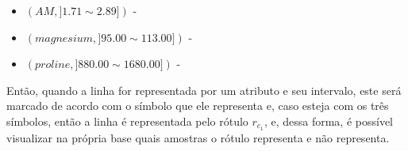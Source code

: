 \begin{itemize}[noitemsep]
\item ${(AM, ] 1.71  \sim  2.89])}$ - \Square
\item ${(magnesium, ] 95.00 \sim  113.00])}$ - \XBox
\item ${(proline, ] 880.00 \sim 1680.00]) }$ - \Circle
\end{itemize}




Então, quando a linha for representada por um atributo e seu intervalo, este será marcado de acordo com o símbolo que ele representa e, caso esteja com os três símbolos, então a linha é representada pelo rótulo ${r_{c_1}}$, e, dessa forma, é possível visualizar na própria base quais amostras o rótulo representa e não representa.
\begin{table}[!ht]
\centering 
\caption{Amostra da Base de Dados Wine com somente três atributos pertencentes ao \textit{cluster} 1 do algoritmo Naive Bayes}
\label{tab:wine:am_magnesium_proline}
\end{table}
